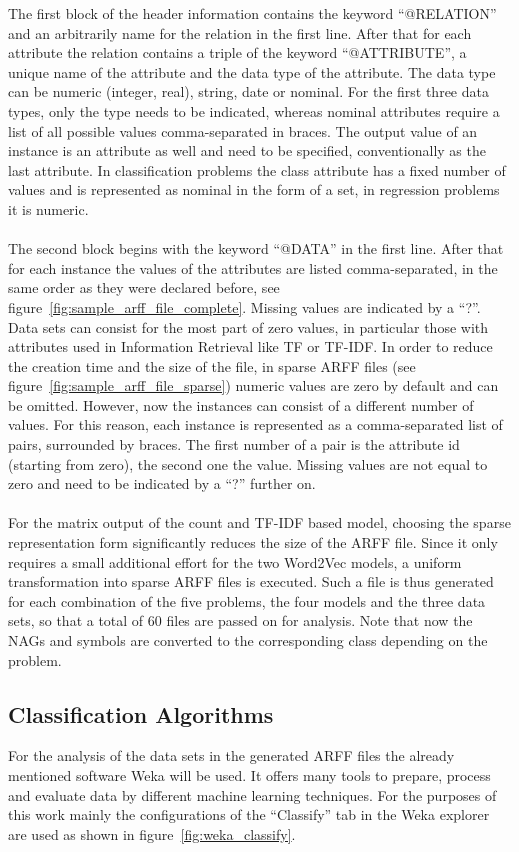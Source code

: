 \documentclass[article,type=msc,colorback,accentcolor=tud7b]{tudthesis}
\begin{document}
    The first block of the header information contains the keyword “@RELATION” and an arbitrarily name for the relation in the first line. After that for each attribute the relation contains a triple of the keyword “@ATTRIBUTE”, a unique name of the attribute and the data type of the attribute. The data type can be numeric (integer, real), string, date or nominal. For the first three data types, only the type needs to be indicated, whereas nominal attributes require a list of all possible values comma-separated in braces. The output value of an instance is an attribute as well and need to be specified, conventionally as the last attribute. In classification problems the class attribute has a fixed number of values and is represented as nominal in the form of a set, in regression problems it is numeric. \\\\
    The second block begins with the keyword “@DATA” in the first line. After that for each instance the values of the attributes are listed comma-separated, in the same order as they were declared before, see figure~\ref{fig:sample_arff_file_complete}. Missing values are indicated by a “?”. Data sets can consist for the most part of zero values, in particular those with attributes used in Information Retrieval like TF or TF-IDF. In order to reduce the creation time and the size of the file, in sparse ARFF files (see figure~\ref{fig:sample_arff_file_sparse}) numeric values are zero by default and can be omitted. However, now the instances can consist of a different number of values. For this reason, each instance is represented as a comma-separated list of pairs, surrounded by braces. The first number of a pair is the attribute id (starting from zero), the second one the value. Missing values are not equal to zero and need to be indicated by a “?” further on. \\\\
    For the matrix output of the count and TF-IDF based model, choosing the sparse representation form significantly reduces the size of the ARFF file. Since it only requires a small additional effort for the two Word2Vec models, a uniform transformation into sparse ARFF files is executed. Such a file is thus generated for each combination of the five problems, the four models and the three data sets, so that a total of 60 files are passed on for analysis. Note that now the NAGs and symbols are converted to the corresponding class depending on the problem.
    
  \subsection{Classification Algorithms}
  \label{subsec:classification_algorithms}
    For the analysis of the data sets in the generated ARFF files the already mentioned software Weka will be used. It offers many tools to prepare, process and evaluate data by different machine learning techniques. For the purposes of this work mainly the configurations of the “Classify” tab in the Weka explorer are used as shown in figure~\ref{fig:weka_classify}.
        
\end{document}
